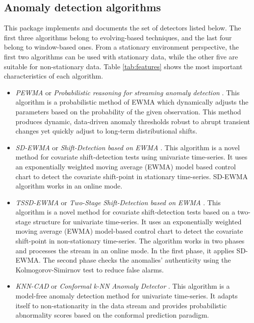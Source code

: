 \documentclass[a4paper]{article}\usepackage[]{graphicx}\usepackage[]{color}
\begin{document}
\subsection{Anomaly detection algorithms} \label{sec:detectors}

This package implements and documents the set of detectors listed below. The first three algorithms belong to evolving-based techniques, and the last four belong to window-based ones. From a stationary environment perspective, the first two algorithms can be used with stationary data, while the other five are suitable for non-stationary data. Table \ref{tab:features} shows the most important characteristics of each algorithm.

\begin{itemize}

\item \emph{PEWMA} or \emph{Probabilistic reasoning for streaming anomaly detection} \cite{pewma}. This algorithm is a probabilistic method of EWMA which dynamically adjusts the parameters based on the probability of the given observation. This method produces dynamic, data-driven anomaly thresholds robust to abrupt transient changes yet quickly adjust to long-term distributional shifts.

\item \emph{SD-EWMA} or \emph{Shift-Detection based on EWMA} \cite{Raza}. This algorithm is a novel method for covariate shift-detection tests using univariate time-series. It uses an exponentially weighted moving average (EWMA) model based control chart to detect the covariate shift-point in stationary time-series. SD-EWMA algorithm works in an online mode.

\item \emph{TSSD-EWMA} or \emph{Two-Stage Shift-Detection based on EWMA} \cite{Raza}. This algorithm is a novel method for covariate shift-detection tests based on a two-stage structure for univariate time-series. It uses an exponentially weighted moving average (EWMA) model-based control chart to detect the covariate shift-point in non-stationary time-series. The algorithm works in two phases and processes the stream in an online mode. In the first phase, it applies SD-EWMA. The second phase checks the anomalies' authenticity using the Kolmogorov-Simirnov test to reduce false alarms.

\item \emph{KNN-CAD} or \emph{Conformal k-NN Anomaly Detector} \cite{2016arXiv160804585B}. This algorithm is a model-free anomaly detection method for univariate time-series. It adapts itself to non-stationarity in the data stream and provides probabilistic abnormality scores based on the conformal prediction paradigm.


\end{itemize}
\end{document}
